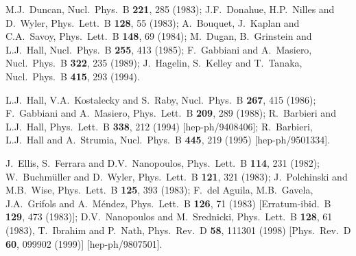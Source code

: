 \documentclass[12pt]{article}
\begin{document}
\begin{thebibliography}{999}
M.J.~Duncan, 
  Nucl.\ Phys.\ B {\bf 221}, 285 (1983);
J.F.~Donahue, H.P.~Nilles and D.~Wyler, 
  Phys.\ Lett.\ B {\bf 128}, 55 (1983);
A.~Bouquet, J.~Kaplan and C.A.~Savoy, 
  Phys.\ Lett.\ B {\bf 148}, 69 (1984);
M.~Dugan, B.~Grinstein and L.J.~Hall, 
  Nucl.\ Phys.\ B {\bf 255}, 413 (1985);
F.~Gabbiani and A.~Masiero, 
  Nucl.\ Phys.\ B {\bf 322}, 235 (1989);
J.~Hagelin, S.~Kelley and T.~Tanaka, 
  Nucl.\ Phys.\ B {\bf 415}, 293 (1994).

L.J.~Hall, V.A.~Kostalecky and S.~Raby,
  Nucl.\ Phys.\ B {\bf 267}, 415 (1986);
F.~Gabbiani and A.~Masiero,
  Phys.\ Lett.\ B {\bf 209}, 289 (1988);
R.~Barbieri and L.J.~Hall,
  Phys.\ Lett.\ B {\bf 338}, 212 (1994)
  [hep-ph/9408406];
R.~Barbieri, L.J.~Hall and A.~Strumia,
  Nucl.\ Phys.\ B {\bf 445}, 219 (1995)
  [hep-ph/9501334].

J.~Ellis, S.~Ferrara and D.V.~Nanopoulos, 
  Phys.\ Lett.\ B {\bf 114}, 231 (1982);
W.~Buchm\"uller and D.~Wyler,
  Phys.\ Lett.\ B {\bf 121}, 321 (1983);
J.~Polchinski and M.B.~Wise, 
  Phys.\ Lett.\ B {\bf 125}, 393 (1983);
F.~del Aguila, M.B.~Gavela, J.A.~Grifols and A.~M\'endez,
  Phys.\ Lett.\ B {\bf 126}, 71 (1983)
  [Erratum-ibid.\ B {\bf 129}, 473 (1983)];
D.V.~Nanopoulos and M.~Srednicki,
  Phys.\ Lett.\ B {\bf 128}, 61 (1983),
T.~Ibrahim and P.~Nath,
  Phys.\ Rev.\ D {\bf 58}, 111301 (1998)
  [Phys.\ Rev.\ D {\bf 60}, 099902 (1999)]
  [hep-ph/9807501].
  

\end{thebibliography}
\end{document}
